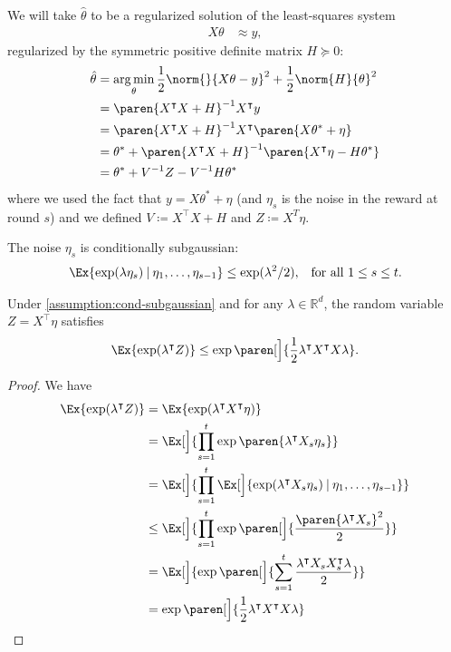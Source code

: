 \documentclass{article}
\newcommand{\defeq}{\coloneq}
\newcommand{\inv}[1]{#1^{-1}}
\newcommand{\Real}{\mathds{R}}
\DeclareMathOperator*{\argmin}{arg\,min}
\newcommand\given[1][\delimsize]{%
  \providecommand{\delimsize}{}
  \nonscript\:#1\vert\allowbreak\nonscript\:\mathopen{}
}
\DeclarePairedDelimiter{\paren}()
\newcommand{\transp}[1]{#1^\intercal}
\begin{document}
We will take $\hat{\theta}$ to be a regularized solution of the
least-squares system
\begin{align*}
  X\theta &\approx y,
\end{align*}
regularized by the symmetric positive definite matrix $H \succeq 0$:
\begin{align*}
  \hat{\theta} &= \argmin_\theta \frac{1}{2}\norm{}{X\theta - y}^2 + \frac{1}{2}\norm{H}{\theta}^2 \\
               &= \inv{\paren{\transp{X}X + H}} \transp{X}y \\
               &= \inv{\paren{\transp{X}X + H}} \transp{X} \paren{X\theta^* + \eta} \\
               &= \theta^* + \inv{\paren{\transp{X}X + H}}\paren{\transp{X}\eta - H\theta^*} \\
               &= \theta^* + \inv{V}Z - \inv{V}H\theta^*
\end{align*}
where we used the fact that $y = X\theta^* + \eta$ (and $\eta_s$ is the
noise in the reward at round $s$) and we defined $V \defeq \transp{X}X
+ H$ and $Z\defeq X^T\eta$.

\begin{assumption}\label{assumption:cond-subgaussian}
  The noise $\eta_s$ is conditionally subgaussian:
  \begin{align*}
    \Ex{\exp(\lambda\eta_s) \given \eta_1,\dotsc,\eta_{s-1}} &\le \exp(\lambda^2/2),
    &\text{for all } 1 \le s \le t.
  \end{align*}
\end{assumption}

\begin{lemma}
  Under \cref{assumption:cond-subgaussian} and for any $\lambda\in\Real^d$, the random variable $Z =
  \transp{X}\eta$ satisfies
  \begin{align*}
    \Ex{\exp(\transp{\lambda}Z)} \le \exp\paren[\Big]{\frac{1}{2}\transp{\lambda}\transp{X}X\lambda}.
  \end{align*}

  \begin{proof}
    We have
    \begin{align*}
      \Ex{\exp(\transp{\lambda}Z)}
      &= \Ex{\exp(\transp{\lambda}\transp{X}\eta)} \\
      &= \Ex[\Big]{\prod_{s=1}^t \exp\paren{\transp{\lambda}X_s\eta_s}} \\
      &= \Ex[\Big]{\prod_{s=1}^t\Ex[\Big]{\exp(\transp{\lambda}X_s\eta_s) \given \eta_1,\dotsc,\eta_{s-1}}} \\
      &\le \Ex[\Big]{\prod_{s=1}^t\exp\paren[\Big]{\frac{\paren{\transp{\lambda}X_s}^2}{2}}} \\
      &= \Ex[\Big]{\exp\paren[\Big]{\sum_{s=1}^t\frac{\transp{\lambda}X_s\transp{X_s}\lambda}{2}}} \\
      &= \exp\paren[\Big]{\frac{1}{2}\transp{\lambda}\transp{X}X\lambda} \qedhere
    \end{align*}
  \end{proof}
\end{lemma}
\end{document}
